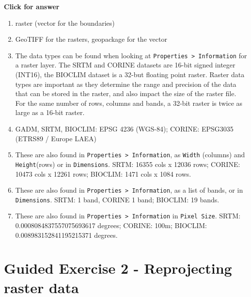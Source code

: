 \documentclass[
  letterpaper,
  DIV=11,
  numbers=noendperiod]{scrreprt}
\begin{document}
\begin{tcolorbox}[enhanced jigsaw, toprule=.15mm, breakable, left=2mm, colframe=quarto-callout-important-color-frame, colback=white, arc=.35mm, leftrule=.75mm, opacityback=0, rightrule=.15mm, bottomrule=.15mm]

\vspace{-3mm}\textbf{Click for answer}\vspace{3mm}

\begin{enumerate}
\def\labelenumi{\alph{enumi})}
\item
  raster (vector for the boundaries)
\item
  GeoTIFF for the rasters, geopackage for the vector
\item
  The data types can be found when looking at
  \texttt{Properties\ \textgreater{}\ Information} for a raster layer.
  The SRTM and CORINE datasets are 16-bit signed integer (INT16), the
  BIOCLIM dataset is a 32-but floating point raster. Raster data types
  are important as they determine the range and precision of the data
  that can be stored in the raster, and also impact the size of the
  raster file. For the same number of rows, columns and bands, a 32-bit
  raster is twice as large as a 16-bit raster.
\item
  GADM, SRTM, BIOCLIM: EPSG 4236 (WGS-84); CORINE: EPSG3035 (ETRS89 /
  Europe LAEA)
\item
  These are also found in
  \texttt{Properties\ \textgreater{}\ Information}, as \texttt{Width}
  (columns) and \texttt{Height}(rows) or in \texttt{Dimensions}. SRTM:
  16355 cols x 12036 rows; CORINE: 10473 cols x 12261 rows; BIOCLIM:
  1471 cols x 1084 rows.
\item
  These are also found in
  \texttt{Properties\ \textgreater{}\ Information}, as a list of bands,
  or in \texttt{Dimensions}. SRTM: 1 band, CORINE 1 band; BIOCLIM: 19
  bands.
\item
  These are also found in
  \texttt{Properties\ \textgreater{}\ Information} in
  \texttt{Pixel\ Size}. SRTM: 0.0008084837557075693617 degrees; CORINE:
  100m; BIOCLIM: 0.008983152841195215371 degrees.
\end{enumerate}

\end{tcolorbox}

\section{Guided Exercise 2 - Reprojecting raster
data}\label{guided-exercise-2---reprojecting-raster-data}
\end{document}
